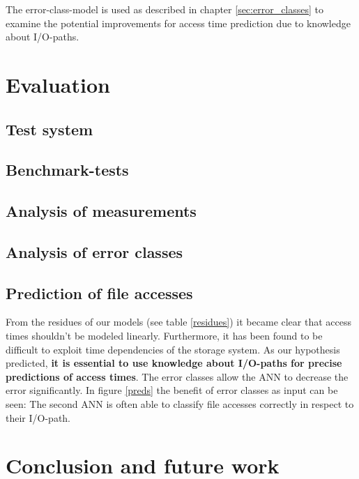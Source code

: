 \documentclass{superfri}
\begin{document}
The error-class-model is used as described in chapter \ref{sec:error_classes} to examine the potential improvements for access time prediction due to knowledge about I/O-paths.
\section{Evaluation}

\subsection{Test system}

\subsection{Benchmark-tests}

\subsection{Analysis of measurements}
\label{sec:measurements}

\subsection{Analysis of error classes}

\subsection{Prediction of file accesses}
From the residues of our models (see table \ref{residues}) it became clear that access times shouldn't be modeled linearly.
Furthermore, it has been found to be difficult to exploit time dependencies of the storage system.
As our hypothesis predicted, \textbf{it is essential to use knowledge about I/O-paths for precise predictions of access times}.
The error classes allow the ANN to decrease the error significantly.
In figure \ref{preds} the benefit of error classes as input can be seen:
The second ANN is often able to classify file accesses correctly in respect to their I/O-path.

\section{Conclusion and future work}


\openaccess



\end{document}
